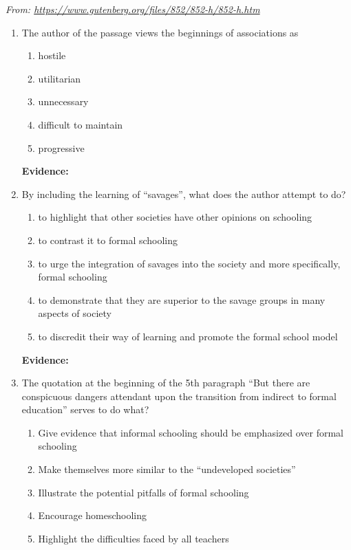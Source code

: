 \textit{From: \url{https://www.gutenberg.org/files/852/852-h/852-h.htm}}

\bigskip
\begin{enumerate}
\item The author of the passage views the beginnings of associations as
\begin{enumerate}[label=(\Alph*)]
\item hostile
\item utilitarian
\item unnecessary
\item difficult to maintain
\item progressive 
\end{enumerate}

\bigskip
\textbf{Evidence:} \hrulefill

\bigskip
\item By including the learning of ``savages'', what does the author attempt to do?
\begin{enumerate}[label=(\Alph*)]
\item to highlight that other societies have other opinions on schooling
\item to contrast it to formal schooling
\item to urge the integration of savages into the society and more specifically, formal schooling
\item to demonstrate that they are superior to the savage groups in many aspects of society
\item to discredit their way of learning and promote the formal school model
\end{enumerate}

\bigskip
\textbf{Evidence:} \hrulefill

\item The quotation at the beginning of the 5th paragraph ``But there are conspicuous dangers attendant upon the transition from indirect to formal education'' serves to do what?

\begin{enumerate}[label=(\Alph*)]
\item Give evidence that informal schooling should be emphasized over formal schooling
\item Make themselves more similar to the ``undeveloped societies''
\item Illustrate the potential pitfalls of formal schooling
\item Encourage homeschooling
\item Highlight the difficulties faced by all teachers
\end{enumerate}


\end{enumerate}
